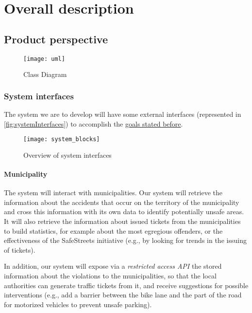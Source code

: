 \section{Overall description}

\subsection{Product perspective}
	
	\begin{figure}[h]
			\centering
			\texttt{[image: uml]}
			\caption{
				\label{fig:systemInterfaces} 
				Class Diagram
			}
		\end{figure}

	\subsubsection{System interfaces}
	\label{sec:systemInterfaces}
		The system we are to develop will have some external interfaces (represented in \autoref{fig:systemInterfaces}) to accomplish the \hyperref[sec:goals]{goals stated before}.
		\begin{figure}[h]
			\centering
			\texttt{[image: system\_blocks]}
			\caption{
				\label{fig:systemInterfaces} 
				Overview of system interfaces
			}
		\end{figure}
	\paragraph{Municipality}
	The system will interact with municipalities. Our system will retrieve the information about the accidents that occur on the territory of the municipality and cross this information with its own data to identify potentially unsafe areas. It will also retrieve the information about issued tickets from the municipalities to build statistics, for example about the most egregious offenders, or the effectiveness of the SafeStreets initiative (e.g., by looking for trends in the issuing of tickets).
	
	 In addition, our system will expose via a \emph{restricted access API} the stored information about the violations to the municipalities, so that the local authorities can generate traffic tickets from it, and receive suggestions for possible interventions (e.g., add a barrier between the bike lane and the part of the road for motorized vehicles to prevent unsafe parking). 
	 
